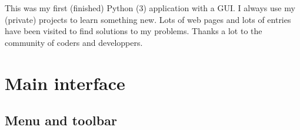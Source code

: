 \documentclass[a4paper,10pt,english]{sphinxmanual}
\begin{document}
This was my first (finished) Python (3) application with a GUI. I always use my
(private) projects to learn something new.
Lots of web pages and lots of  entries
have been visited to find solutions to my problems.
Thanks a lot to the community of coders and developpers.


\chapter{Main interface}
\label{\detokenize{main:main-interface}}\label{\detokenize{main::doc}}

\section{Menu and toolbar}
\label{\detokenize{main:menu-and-toolbar}}
\end{document}
